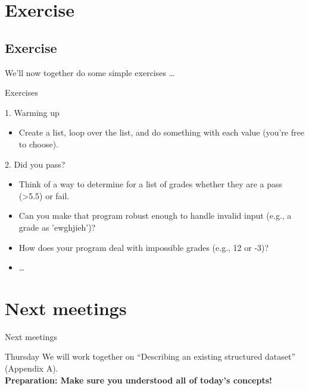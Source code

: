 \documentclass{beamer}
\begin{document}
\section{Exercise}
\subsection*{Exercise}
\begin{frame}
We'll now together do some simple exercises \ldots
\end{frame}



\begin{frame}{Exercises}
\begin{block}{1. Warming up}
\begin{itemize}
	\item Create a list, loop over the list, and do something with each value (you're free to choose). 
\end{itemize}
\end{block}
\begin{block}{2. Did you pass?}
	\begin{itemize}
	\item Think of a way to determine for a list of  grades whether they are a pass (>5.5) or fail.
	\item Can you make that program robust enough to handle invalid input (e.g., a grade as 'ewghjieh')?
	\item How does your program deal with impossible grades (e.g., 12 or -3)?
	\item \ldots
\end{itemize}
\end{block}
\end{frame}

\section{Next meetings}
\begin{frame}
Next meetings
\end{frame}


\begin{frame}{Thursday}
	We will work together on ``Describing an existing structured dataset'' (Appendix A).\\
	\textbf{Preparation: Make sure you understood all of today's concepts!}
\end{frame}
\end{document}
